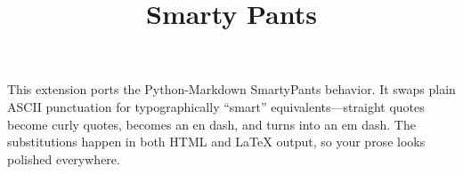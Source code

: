 \documentclass[a4paper,twoside]{article}
\title{Smarty Pants}
\author{}\date{}
\begin{document}
\maketitle
This extension ports the Python-Markdown SmartyPants behavior. It swaps
plain ASCII punctuation for typographically ``smart'' equivalents---straight quotes
become curly quotes, \tscodeinline{-\allowbreak{}-\allowbreak{}} becomes an en dash, and \tscodeinline{-\allowbreak{}-\allowbreak{}-\allowbreak{}} turns into an em dash.
The substitutions happen in both HTML and \LaTeX{} output, so your prose looks
polished everywhere.
\end{document}
